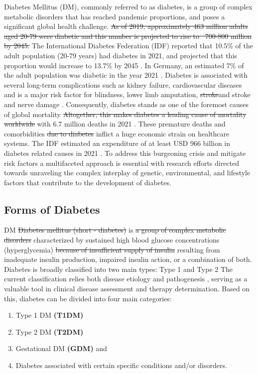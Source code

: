 Diabetes Mellitus (DM), commonly referred to as diabetes, is a group of complex metabolic disorders that has reached pandemic proportions, and poses a significant global health challenge. \st{As of 2019, approximately 463 million adults aged 20-79 were diabetic and this number is projected to rise to ~700-800 million by 2045.} The International Diabetes Federation (IDF) reported that 10.5\% of the adult population (20-79 years) had diabetes in 2021, and projected that this proportion would increase to 13.7\% by 2045 \cite{home_idf_nodate}. In Germany, an estimated 7\% of the adult population was diabetic in the year 2021 \cite{noauthor_germany_nodate}. Diabetes is associated with several long-term complications such as kidney failure, cardiovascular diseases and is a major risk factor for blindness, lower limb amputation, \st{stroke}and stroke and nerve damage \cite{ashcroft_diabetes_2012,emerging_risk_factors_collaboration_diabetes_2010,leon_diabetes_2015}. Consequently, diabetes stands as one of the foremost causes of global mortality \st{Altogether, this makes diabetes a leading cause of mortality worldwide} with 6.7 million deaths in 2021 \cite{home_idf_nodate}. These premature deaths and comorbidities \st{due to diabetes} inflict a huge economic strain on healthcare systems. The IDF estimated an expenditure of at least USD 966 billion in diabetes related causes in 2021 \cite{home_idf_nodate}. To address this burgeoning crisis and mitigate risk factors a multifaceted approach is essential with research efforts directed towards unraveling the complex interplay of genetic, environmental, and lifestyle factors that contribute to the development of diabetes. 

\subsection{Forms of Diabetes} %
\label{sec:forsmDiabets}

DM \st{Diabetes mellitus (short - diabetes)} is \st{a group of complex metabolic disorders} characterized by sustained high blood glucose concentrations (hyperglycemia) \st{because of insufficient supply of insulin} resulting from inadequate insulin production, impaired insulin action, or a combination of both. Diabetes is broadly classified into two main types: Type 1 and Type 2  The current classification relies both disease etiology and pathogenesis \textbf{\cite{banday_pathophysiology_2020}}, serving as a valuable tool in clinical disease assessment and therapy determination. Based on this, diabetes can be divided into four main categories:\\
\begin{enumerate}
    \item Type 1 DM \textbf{(T1DM)}
    \item Type 2 DM \textbf{(T2DM)} 
    \item Gestational DM \textbf{(GDM)} and 
    \item Diabetes associated with certain specific conditions and/or disorders.
\end{enumerate}


